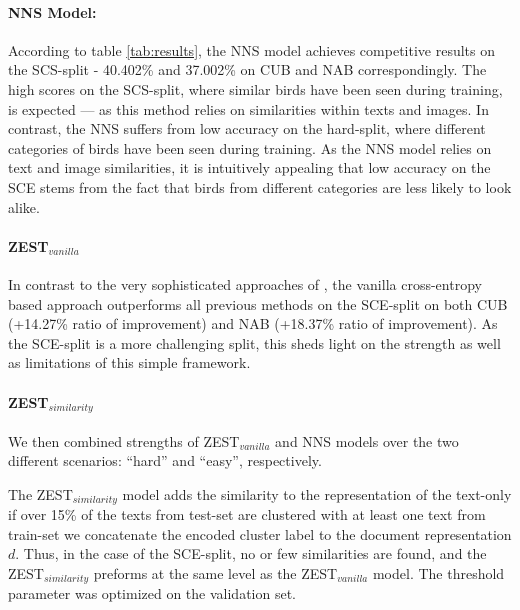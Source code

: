 \documentclass[11pt,a4paper]{article}
\newcommand\yuval[1]{\textcolor{darkpink}{\textbf{YUVAL:} #1 }}
\begin{document}
\paragraph{NNS Model:} 
According to table \ref{tab:results}, the NNS model achieves competitive results on the SCS-split - 40.402\% and 37.002\% on CUB and NAB correspondingly. The high scores on the SCS-split, where similar birds have been seen during training, is expected --- as this method relies on similarities within texts and images. 
%
In contrast, the NNS suffers from low accuracy on the hard-split, where different categories of birds have been seen  during training. As the NNS model relies on text and image similarities, it is intuitively appealing that low accuracy on the SCE stems from the fact that birds from different categories are less likely to look alike. 

\paragraph{ZEST$_{vanilla}$}
In contrast to the very sophisticated approaches of \citet{zhu2018generative}, the vanilla cross-entropy based approach %
outperforms all previous methods on the SCE-split on both CUB (+14.27\% ratio of improvement) and NAB (+18.37\%  ratio of improvement). As the SCE-split is a more challenging split, this sheds light on the strength as well as limitations of this simple framework.  

\paragraph{ZEST$_{similarity}$}

We then combined strengths of ZEST$_{vanilla}$ and NNS models over the two different scenarios: \enquote{hard} and \enquote{easy}, respectively. 

The ZEST$_{similarity}$ model adds the similarity to the representation of the text-only if over 15\% of the texts from test-set are clustered with at least one text from train-set we concatenate the encoded cluster label to the document representation $d$.
Thus, in the case of the SCE-split, no or few similarities are found, and the ZEST$_{similarity}$ preforms at the same level as the ZEST$_{vanilla}$ model. %
The threshold parameter was optimized on the validation set. 
\end{document}
